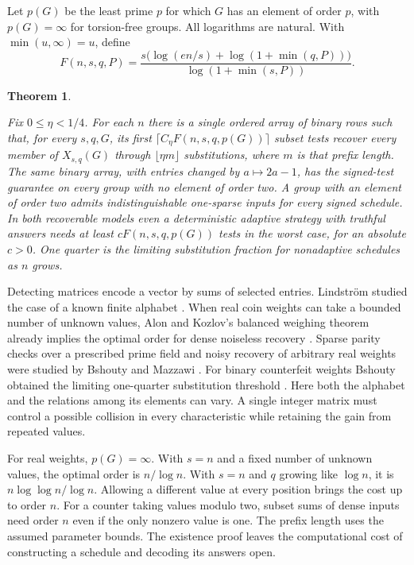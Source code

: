 \documentclass[11pt,letterpaper]{article}
\newtheorem{theorem}{Theorem}[section]
\numberwithin{equation}{section}
\begin{document}
Let $p(G)$ be the least prime $p$ for which $G$ has an element of order $p$, with
$p(G)=\infty$ for torsion-free groups. All logarithms are natural. With $\min(u,\infty)=u$,
define
\[
F(n,s,q,P)=
\frac{s\bigl(\log(en/s)+\log(1+\min(q,P))\bigr)}
     {\log(1+\min(s,P))}.
\]

\begin{theorem}\label{thm:rate}

Fix $0\le\eta<1/4$. For each $n$ there is a single ordered array of binary rows such that, for
every $s,q,G$, its first $\lceil C_\eta F(n,s,q,p(G))\rceil$ subset tests recover every member
of $X_{s,q}(G)$ through $\lfloor\eta m\rfloor$ substitutions, where $m$ is that prefix length.
The same binary array, with entries changed by $a\mapsto2a-1$, has the signed-test guarantee
on every group with no element of order two. A group with an element of order two admits
indistinguishable one-sparse inputs for every signed schedule. In both recoverable models even
a deterministic adaptive strategy with truthful answers needs at least $cF(n,s,q,p(G))$ tests
in the worst case, for an absolute $c>0$. One quarter is the limiting substitution fraction
for nonadaptive schedules as $n$ grows.
\end{theorem}

Detecting matrices encode a vector by sums of selected entries. Lindstr\"om studied the case
of a known finite alphabet \cite{lindstrom}. When real coin weights can take a bounded number
of unknown values, Alon and Kozlov's balanced weighing theorem already implies the optimal
order for dense noiseless recovery \cite{alon}. Sparse parity checks over a prescribed prime
field and noisy recovery of arbitrary real weights were studied by Bshouty and Mazzawi
\cite{bm,bmnoise}. For binary counterfeit weights Bshouty obtained the limiting one-quarter substitution threshold \cite{bnoise}. Here both the alphabet and the relations among its elements can vary. A
single integer matrix must control a possible collision in every characteristic while
retaining the gain from repeated values.

For real weights, $p(G)=\infty$. With $s=n$ and a fixed number of unknown values, the optimal
order is $n/\log n$. With $s=n$ and $q$ growing like $\log n$, it is $n\log\log n/\log n$.
Allowing a different value at every position brings the cost up to order $n$. For a counter
taking values modulo two, subset sums of dense inputs need order $n$ even if the only nonzero
value is one. The prefix length uses the assumed parameter bounds. The existence proof leaves
the computational cost of constructing a schedule and decoding its answers open.
\end{document}
